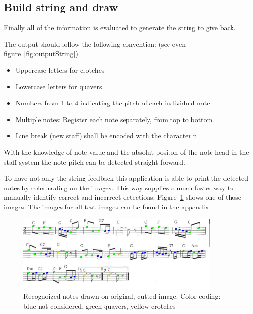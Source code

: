 \subsection{Build string and draw}
Finally all of the information is evaluated to generate the string to give back. 

The output should follow the following convention: (see even figure~\ref{fig:outputString})

\begin{itemize}
\item Uppercase letters for crotches
\item Lowercase letters for quavers
\item Numbers from 1 to 4 indicating the pitch of each individual note
\item Multiple notes:
Register each note separately, from top to bottom
\item Line break (new staff) shall be encoded with the character n
\end{itemize}


With the knowledge of note value and the absolut positon of the note head in the staff system the note pitch can be detected straight forward. 

To have not only the string feedback this application is able to print the detected notes by color coding on the images.
This way supplies a much faster way to manually identify correct and incorrect detections. Figure~\ref{fig:finalImage} shows one of those images. The images for all test images can be found in the appendix. 

\begin{figure}[th]
    \centering
		\includegraphics[width=0.9\textwidth]{im1s_compare.jpg}
		\caption[Recognized notes drawn on original, cutted image]{Recognoized notes drawn on original, cutted image. Color coding: blue-not considered, green-quavers,  yellow-crotches \label{fig:finalImage}}
\end{figure}




